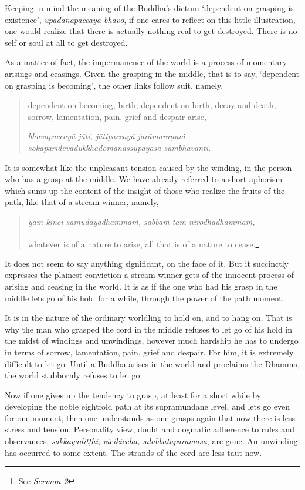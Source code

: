 Keeping in mind the meaning of the Buddha's dictum `dependent on grasping is existence', \emph{upādānapaccayā bhavo}, if one cares to reflect on this little illustration, one would realize that there is actually nothing real to get destroyed. There is no self or soul at all to get destroyed.

As a matter of fact, the impermanence of the world is a process of momentary arisings and ceasings. Given the grasping in the middle, that is to say, `dependent on grasping is becoming', the other links follow suit, namely,

\begin{quote}
dependent on becoming, birth; dependent on birth, decay-and-death, sorrow, lamentation, pain, grief and despair arise,

\emph{bhavapaccayā jāti, jātipaccayā jarāmaraṇaṁ sokaparidevadukkhadomanassūpāyāsā sambhavanti.}
\end{quote}

It is somewhat like the unpleasant tension caused by the winding, in the person who has a grasp at the middle. We have already referred to a short aphorism which sums up the content of the insight of those who realize the fruits of the path, like that of a stream-winner, namely,

\begin{quote}
\emph{yaṁ kiñci samudayadhammaṁ, sabbaṁ taṁ nirodhadhammaṁ,}

whatever is of a nature to arise, all that is of a nature to cease.\footnote{See \emph{Sermon 2}}
\end{quote}

It does not seem to say anything significant, on the face of it. But it succinctly expresses the plainest conviction a stream-winner gets of the innocent process of arising and ceasing in the world. It is as if the one who had his grasp in the middle lets go of his hold for a while, through the power of the path moment.

It is in the nature of the ordinary worldling to hold on, and to hang on. That is why the man who grasped the cord in the middle refuses to let go of his hold in the midst of windings and unwindings, however much hardship he has to undergo in terms of sorrow, lamentation, pain, grief and despair. For him, it is extremely difficult to let go. Until a Buddha arises in the world and proclaims the Dhamma, the world stubbornly refuses to let go.

Now if one gives up the tendency to grasp, at least for a short while by developing the noble eightfold path at its supramundane level, and lets go even for one moment, then one understands as one grasps again that now there is less stress and tension. Personality view, doubt and dogmatic adherence to rules and observances, \emph{sakkāyadiṭṭhi}, \emph{vicikicchā, sīlabbataparāmāsa}, are gone. An unwinding has occurred to some extent. The strands of the cord are less taut now.

